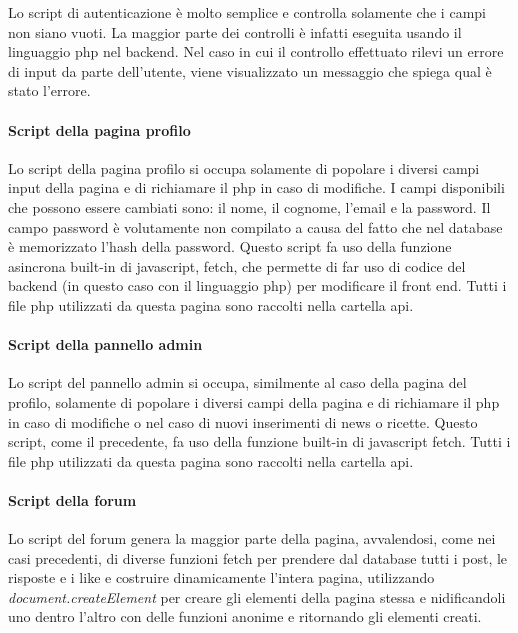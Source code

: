 Lo script di autenticazione è molto semplice e controlla solamente che i campi non siano vuoti. La maggior parte dei controlli è infatti eseguita usando il linguaggio php nel backend. Nel caso in cui il controllo effettuato rilevi un errore di input da parte dell'utente, viene visualizzato un messaggio che spiega qual è stato l'errore. 

\paragraph{Script della pagina profilo}

Lo script della pagina profilo si occupa solamente di popolare i diversi campi input della pagina e di richiamare il php in caso di modifiche. I campi disponibili che possono essere cambiati sono: il nome, il cognome, l'email e la password. Il campo password è volutamente non compilato a causa 
del fatto che nel database è memorizzato l'hash della password. Questo script fa uso della funzione asincrona built-in di javascript, fetch, che permette di far uso di codice del backend (in questo caso con il linguaggio php) per modificare il 
front end. Tutti i file php utilizzati da questa pagina sono raccolti nella cartella api.

\paragraph{Script della pannello admin}

Lo script del pannello admin si occupa, similmente al caso della pagina del profilo, solamente di popolare i diversi campi della pagina e di richiamare il php in caso di modifiche o nel caso di nuovi inserimenti di news o ricette. 
Questo script, come il precedente, fa uso della funzione built-in di javascript fetch. 
Tutti i file php utilizzati da questa pagina sono raccolti nella cartella api.

\paragraph{Script della forum}

Lo script del forum genera la maggior parte della pagina, avvalendosi, come nei casi precedenti, di diverse funzioni fetch per prendere dal database tutti i post, le risposte e i like e costruire dinamicamente l'intera pagina, utilizzando 
\textit{document.createElement} per creare gli elementi della pagina stessa e nidificandoli uno dentro l'altro con delle funzioni anonime e ritornando gli elementi creati. 




